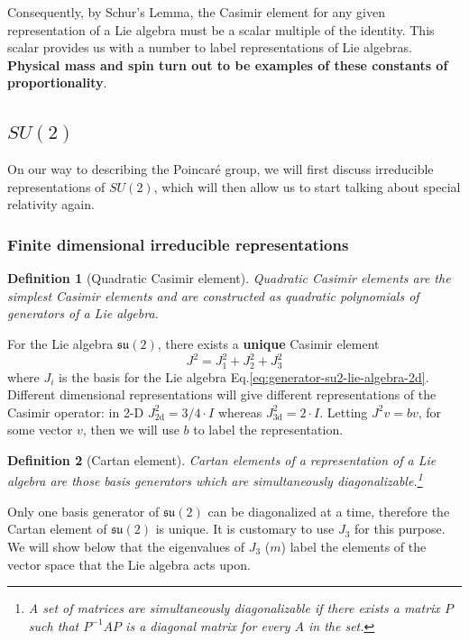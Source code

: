 \documentclass[11pt]{article}
\numberwithin{equation}{section}
\newtheorem{defn}{Definition}[section]
\begin{document}
Consequently, by Schur's Lemma, the Casimir element for any given representation of a Lie algebra must be a scalar multiple of the identity. This scalar provides us with a number to label representations of Lie algebras. \textbf{Physical mass and spin turn out to be examples of these constants of proportionality}.

\subsection{$SU(2)$}

On our way to describing the Poincar\'{e} group, we will first discuss irreducible representations of $SU(2)$, which will then allow us to start talking about special relativity again.

\subsubsection{Finite dimensional irreducible representations}\label{sec:finite-dim-irr-repr}

\begin{defn}[Quadratic Casimir element]
Quadratic Casimir elements are the simplest Casimir elements and are constructed as quadratic polynomials of generators of a Lie algebra.
\end{defn}

For the Lie algebra $\mathfrak{su}(2)$, there exists a \textbf{unique} Casimir element
\begin{equation}
J^2 = J_1^2 + J_2^2 + J_3^2
\end{equation}
where $J_i$ is the basis for the Lie algebra Eq.\eqref{eq:generator-su2-lie-algebra-2d}. Different dimensional representations will give different representations of the Casimir operator: in 2-D $J^2_{2\mathrm{d}}=3/4 \cdot I$ whereas $J^2_{3\mathrm{d}}=2 \cdot I$. Letting $J^2 v = b v$, for some vector $v$, then we will use $b$ to label the representation.

\begin{defn}[Cartan element]
Cartan elements of a representation of a Lie algebra are those basis generators which are simultaneously diagonalizable.\footnote{A set of matrices are simultaneously diagonalizable if there exists a matrix $P$ such that $P^{-1}AP$ is a diagonal matrix for every $A$ in the set.}
\end{defn}

Only one basis generator of $\mathfrak{su}(2)$ can be diagonalized at a time, therefore the Cartan element of $\mathfrak{su}(2)$ is unique. It is customary to use $J_3$ for this purpose. We will show below that the eigenvalues of $J_3$ ($m$) label the elements of the vector space that the Lie algebra acts upon.
\end{document}

